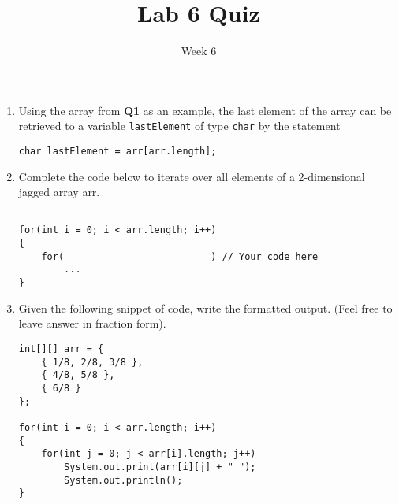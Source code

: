 \documentclass[12pt]{article}
\title{Lab 6 Quiz}
\date{Week 6}
\begin{document}
 

\Instructions

\begin{enumerate}
    
\item {} \tf Using the array from \textbf{Q1} as an example, the last element of the array can be retrieved to a variable \texttt{lastElement} of type \texttt{char} by the statement
\begin{lstlisting}
char lastElement = arr[arr.length];
\end{lstlisting}


\item {} Complete the code below to iterate over all elements of a 2-dimensional jagged array arr.

\begin{lstlisting}

for(int i = 0; i < arr.length; i++)
{
	for(                          ) // Your code here
        ...
}
\end{lstlisting}
	

\item {} Given the following snippet of code, write the formatted output. (Feel free to leave answer in fraction form).
\begin{lstlisting}
int[][] arr = {
	{ 1/8, 2/8, 3/8 },
	{ 4/8, 5/8 },
	{ 6/8 }
};

for(int i = 0; i < arr.length; i++)
{
	for(int j = 0; j < arr[i].length; j++)
		System.out.print(arr[i][j] + " ");
    	System.out.println();
}
\end{lstlisting}


\clearpage
\ifdraft \clearpage \fi

\end{enumerate}   
\end{document}
